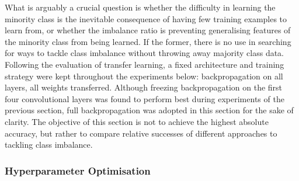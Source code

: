 \documentclass[a4paper,11pt]{article}
\begin{document}
What is arguably a crucial question is whether the difficulty in learning the minority class is the inevitable consequence of having few training examples to learn from, or whether the imbalance ratio is preventing generalising features of the minority class from being learned. If the former, there is no use in searching for ways to tackle class imbalance without throwing away majority class data.  \\

Following the evaluation of transfer learning, a fixed architecture and training strategy were kept throughout the experiments below: backpropagation on all layers, all weights transferred. Although freezing backpropagation on the first four convolutional layers was found to perform best during experiments of the previous section, full backpropagation was adopted in this section for the sake of clarity. The objective of this section is not to achieve the highest absolute accuracy, but rather to compare relative successes of different approaches to tackling class imbalance.


\subsubsection{Hyperparameter Optimisation}

%
%
%


\end{document}
